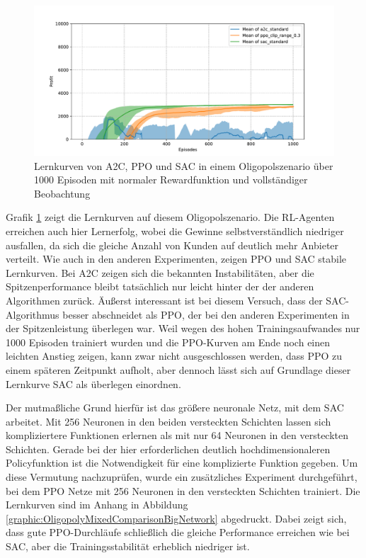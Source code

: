 \begin{figure}[htb]
	\centering
	\includegraphics[width=\textwidth]{main/comparison_oligopoly.pdf}
	\caption{Lernkurven von A2C, PPO und SAC in einem Oligopolszenario über 1000 Episoden mit normaler Rewardfunktion und vollständiger Beobachtung}
	\label{graphic:OligopolyComparison}
\end{figure}

Grafik \ref{graphic:OligopolyComparison} zeigt die Lernkurven auf diesem Oligopolszenario.
Die RL-Agenten erreichen auch hier Lernerfolg, wobei die Gewinne selbstverständlich niedriger ausfallen, da sich die gleiche Anzahl von Kunden auf deutlich mehr Anbieter verteilt.
Wie auch in den anderen Experimenten, zeigen PPO und SAC stabile Lernkurven.
Bei A2C zeigen sich die bekannten Instabilitäten, aber die Spitzenperformance bleibt tatsächlich nur leicht hinter der der anderen Algorithmen zurück.
Äußerst interessant ist bei diesem Versuch, dass der SAC-Algorithmus besser abschneidet als PPO, der bei den anderen Experimenten in der Spitzenleistung überlegen war.
Weil wegen des hohen Trainingsaufwandes nur 1000 Episoden trainiert wurden und die PPO-Kurven am Ende noch einen leichten Anstieg zeigen, kann zwar nicht ausgeschlossen werden, dass PPO zu einem späteren Zeitpunkt aufholt, aber dennoch lässt sich auf Grundlage dieser Lernkurve SAC als überlegen einordnen.

Der mutmaßliche Grund hierfür ist das größere neuronale Netz, mit dem SAC arbeitet.
Mit 256 Neuronen in den beiden versteckten Schichten lassen sich kompliziertere Funktionen erlernen als mit nur 64 Neuronen in den versteckten Schichten.
Gerade bei der hier erforderlichen deutlich hochdimensionaleren Policyfunktion ist die Notwendigkeit für eine komplizierte Funktion gegeben.
Um diese Vermutung nachzuprüfen, wurde ein zusätzliches Experiment durchgeführt, bei dem PPO Netze mit 256 Neuronen in den versteckten Schichten trainiert.
Die Lernkurven sind im Anhang in Abbildung \ref{graphic:OligopolyMixedComparisonBigNetwork} abgedruckt.
Dabei zeigt sich, dass gute PPO-Durchläufe schließlich die gleiche Performance erreichen wie bei SAC, aber die Trainingsstabilität erheblich niedriger ist.


